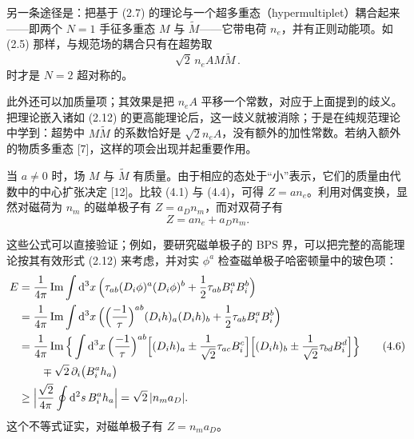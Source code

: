 \documentclass[11pt,a4paper,UTF8,fontset=fandol]{ctexart}
\theoremstyle{plain}
\theoremstyle{definition}
\newcommand{\dd}{\mathrm{d}}
\renewcommand{\Im}{\operatorname{Im}}
\newcommand{\Nc}{\mathcal{N}}
\def\Nc{N}%
\begin{document}
另一条途径是：把基于 (2.7) 的理论与一个超多重态（hypermultiplet）耦合起来——即两个 $\Nc=1$ 手征多重态 $M$ 与 $\widetilde M$——它带电荷 $n_e$，并有正则动能项。如 (2.5) 那样，与规范场的耦合只有在超势取
\begin{equation}
  \sqrt2\,n_e A M\widetilde M\,. \tag{4.4}
\end{equation}
时才是 $\Nc=2$ 超对称的。

此外还可以加质量项；其效果是把 $n_eA$ 平移一个常数，对应于上面提到的歧义。把理论嵌入诸如 (2.12) 的更高能理论后，这一歧义就被消除；于是在纯规范理论中学到：超势中 $M\widetilde M$ 的系数恰好是 $\sqrt2 n_eA$，没有额外的加性常数。若纳入额外的物质多重态 [7]，这样的项会出现并起重要作用。

当 $a\ne0$ 时，场 $M$ 与 $\widetilde M$ 有质量。由于相应的态处于“小”表示，它们的质量由代数中的中心扩张决定 [12]。比较 (4.1) 与 (4.4)，可得 $Z=an_e$。利用对偶变换，显然对磁荷为 $n_m$ 的磁单极子有 $Z=a_Dn_m$，而对双荷子有
\begin{equation}
  Z=an_e+a_Dn_m. \tag{4.5}
\end{equation}

这些公式可以直接验证；例如，要研究磁单极子的 BPS 界，可以把完整的高能理论按其有效形式 (2.12) 来考虑，并对实 $\phi^a$ 检查磁单极子哈密顿量中的玻色项：
\begin{align}
  E&=\frac{1}{4\pi}\Im\int \dd^3x\,\Big(\tau_{ab}(D_i\phi)^a(D_i\phi)^b+\frac12\tau_{ab}B_i^aB_i^b\Big)\nonumber\\
   &=\frac{1}{4\pi}\Im\int \dd^3x\,\Big(\Bigl(\frac{-1}{\tau}\Bigr)^{ab}(D_ih)_a(D_ih)_b+\frac12\tau_{ab}B_i^aB_i^b\Big)\nonumber\\
   &=\frac{1}{4\pi}\Im\Big\{\int \dd^3x\,\Bigl(\frac{-1}{\tau}\Bigr)^{ab}\Big[(D_ih)_a\pm\frac{1}{\sqrt2}\tau_{ac}B_i^c\Big]\Big[(D_ih)_b\pm\frac{1}{\sqrt2}\tau_{bd}B_i^d\Big]\Big\}\tag{4.6}\\
   &\qquad\mp\sqrt2\,\partial_i\big(B_i^ah_a\big)\nonumber\\
   &\ge\Big|\frac{\sqrt2}{4\pi}\oint \dd^2s\,B_i^ah_a\Big|=\sqrt2\,|n_ma_D|.\nonumber
\end{align}
这个不等式证实，对磁单极子有 $Z=n_ma_D$。
\end{document}
